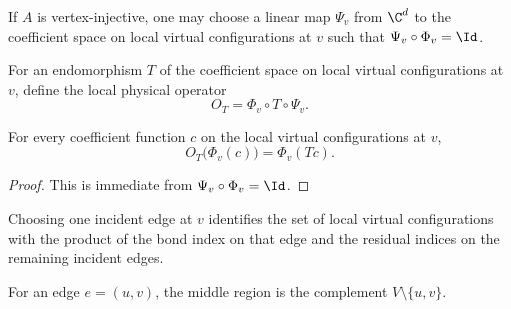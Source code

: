 \begin{definition}%
    \label{def:peps_localLeftInverse}
    \leanok
    If $A$ is vertex-injective, one may choose a linear map $\Psi_v$ from
    $\C^d$ to the coefficient space on local virtual configurations at $v$
    such that $\Psi_v \circ \Phi_v = \Id$.
\end{definition}

\begin{definition}%
    \label{def:peps_physRealizeLocalOp}
    \leanok
    For an endomorphism $T$ of the coefficient space on local virtual
    configurations at $v$, define the local physical operator
    \[
        O_T = \Phi_v \circ T \circ \Psi_v .
    \]
\end{definition}

\begin{theorem}%
    \label{thm:peps_physRealizeLocalOp_spec}
    \leanok
    For every coefficient function $c$ on the local virtual configurations at
    $v$,
    \[
        O_T\bigl(\Phi_v(c)\bigr) = \Phi_v(Tc).
    \]
\end{theorem}
\begin{proof}\leanok
    This is immediate from $\Psi_v \circ \Phi_v = \Id$.
\end{proof}

\begin{definition}%
    \label{def:peps_localVirtualConfigSplitAt}
    \leanok
    Choosing one incident edge at $v$ identifies the set of local virtual
    configurations with the product of the bond index on that edge and the
    residual indices on the remaining incident edges.
\end{definition}

\begin{definition}%
    \label{def:peps_edgeMiddleVertices}
    \leanok
    For an edge $e = (u,v)$, the middle region is the complement
    $V \setminus \{u,v\}$.
\end{definition}


